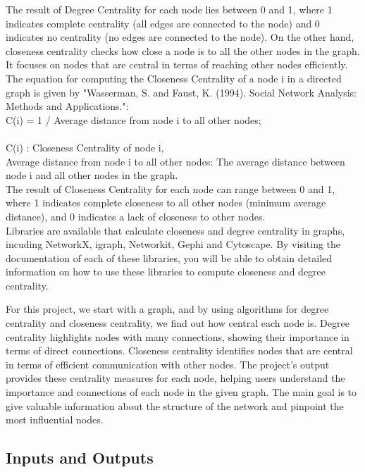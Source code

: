 \documentclass{article}
\begin{document}
The result of Degree Centrality for each node lies between 0 and 1, where 1 indicates complete centrality (all edges are connected to the node) and 0 indicates no centrality (no edges are connected to the node).
On the other hand, closeness centrality checks how close a node is to all the other nodes in the graph. It focuses on nodes that are central in terms of reaching other nodes efficiently. The equation for computing the Closeness Centrality of a node 
i in a directed graph is given by "Wasserman, S. and Faust, K. (1994). Social Network Analysis: Methods and Applications.":\\

C(i) = 1 / Average distance from node i to all other nodes;\\
\\
C(i) : Closeness Centrality of node i,\\
Average distance from node i to all other nodes: The average distance between node i and all other nodes in the graph.\\

The result of Closeness Centrality for each node can range between 0 and 1, where 1 indicates complete closeness to all other nodes (minimum average distance), and 0 indicates a lack of closeness to other nodes.\\

Libraries are available that calculate closeness and degree centrality in graphs, incuding NetworkX, igraph, Networkit, Gephi and Cytoscape. By visiting the documentation of each of these libraries, you will be able to obtain detailed information on how to use these libraries to compute closeness and degree centrality.

For this project, we start with a graph, and by using algorithms for degree centrality and closeness centrality, we find out how central each node is. Degree centrality highlights nodes with many connections, showing their importance in terms of direct connections. Closeness centrality identifies nodes that are central in terms of efficient communication with other nodes. The project's output provides these centrality measures for each node, helping users understand the importance and connections of each node in the given graph. The main goal is to give valuable information about the structure of the network and pinpoint the most influential nodes.

\subsection{Inputs and Outputs}
\end{document}
